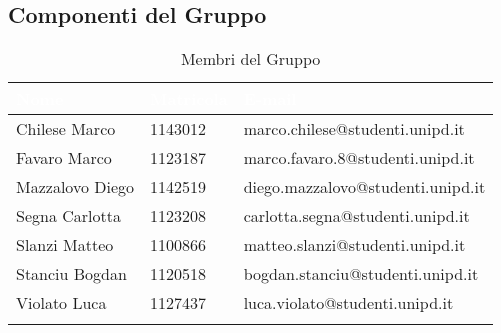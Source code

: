 \subsection{Componenti del Gruppo}

\begin{longtable}{|C{.25\textwidth}|C{.16\textwidth}|C{.45\textwidth}|}
\hline
{}\textbf{\textcolor{white}{Nome}} & \textbf{\textcolor{white}{Matricola}} & \textbf{\textcolor{white}{E-mail}}\\
\hline \hline
\endfirsthead
Chilese Marco & 1143012 & marco.chilese@studenti.unipd.it \\
\hline
{}Favaro Marco & 1123187 & marco.favaro.8@studenti.unipd.it \\
\hline
Mazzalovo Diego & 1142519 & diego.mazzalovo@studenti.unipd.it \\
\hline
{}Segna Carlotta & 1123208 & carlotta.segna@studenti.unipd.it \\
\hline
Slanzi Matteo & 1100866 & matteo.slanzi@studenti.unipd.it \\
\hline
{}Stanciu Bogdan & 1120518 & bogdan.stanciu@studenti.unipd.it \\
\hline
Violato Luca & 1127437 & luca.violato@studenti.unipd.it \\
\hline
\caption{Membri del Gruppo}
\label{Tabella Membri del Gruppo}
\end{longtable}
